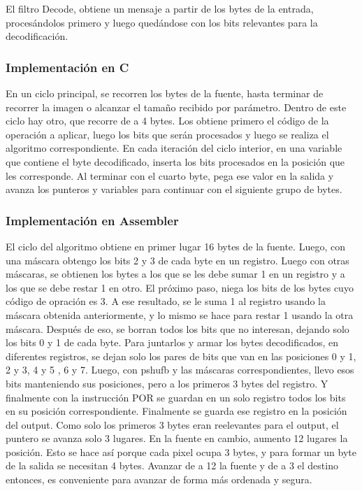 El filtro Decode, obtiene un mensaje a partir de los bytes de la entrada, proces\'andolos primero y luego qued\'andose con los bits relevantes para la 
decodificaci\'on.

\subsubsection{Implementación en C}
En un ciclo principal, se recorren los bytes de la fuente, hasta terminar de recorrer la imagen o alcanzar el tamaño recibido por par\'ametro. Dentro de 
este ciclo hay otro, que recorre de a 4 bytes. Los obtiene primero el c\'odigo de la operación a aplicar, luego los bits que ser\'an procesados y luego 
se realiza el algoritmo correspondiente. En cada iteraci\'on del ciclo interior, en una variable que contiene el byte decodificado, inserta los bits 
procesados en la posici\'on que les corresponde. Al terminar con el cuarto byte, pega ese valor en la salida y avanza los punteros y variables para 
continuar con el siguiente grupo de bytes.

\subsubsection{Implementación en Assembler}
El ciclo del algoritmo obtiene en primer lugar 16 bytes de la fuente. Luego, con una m\'ascara obtengo los bits 2 y 3 de cada byte en un registro. Luego 
con otras m\'ascaras, se obtienen los bytes a los que se les debe sumar 1 en un registro y a los que se debe restar 1 en otro. El pr\'oximo paso, niega 
los bits de los bytes cuyo c\'odigo de opraci\'on es 3. A ese resultado, se le suma 1 al registro usando la m\'ascara obtenida anteriormente, y lo mismo 
se hace para restar 1 usando la otra m\'ascara. Despu\'es de eso, se borran todos los bits que no interesan, dejando solo los bits 0 y 1 de cada byte.\newline
Para juntarlos y armar los bytes decodificados, en diferentes registros, se dejan solo los pares de bits que van en las posiciones 0 y 1, 2 y 3, 4 y 5 , 
6 y 7. Luego, con pshufb y las m\'ascaras correspondientes, llevo esos bits manteniendo sus posiciones, pero a los primeros 3 bytes del registro. Y 
finalmente con la instrucci\'on POR se guardan en un solo registro todos los bits en su posici\'on correspondiente. Finalmente se guarda ese registro en 
la posición del output. Como solo los primeros 3 bytes eran reelevantes para el output, el puntero se avanza solo 3 lugares. En la fuente en cambio, 
aumento 12 lugares la posici\'on. Esto se hace as\'i porque cada pixel ocupa 3 bytes, y para formar un byte de la salida se necesitan 4 bytes. Avanzar de
 a 12 la fuente y de a 3 el destino entonces, es conveniente para avanzar de forma m\'as ordenada y segura.

